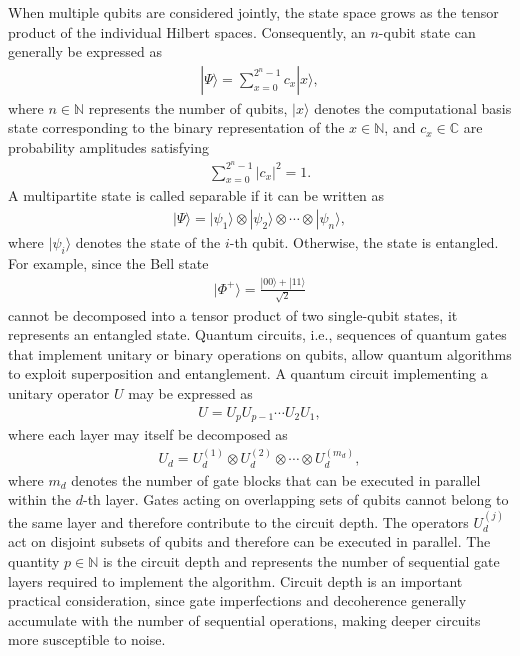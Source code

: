 When multiple qubits are considered jointly, the state space grows as the tensor product of the individual Hilbert spaces. Consequently, an $n$-qubit state can generally be expressed as \begin{align} 
|\Psi\rangle = \sum_{x=0}^{2^n-1} c_x |x\rangle,
\end{align} 
where $n \in \mathbb{N}$ represents the number of qubits, $|x\rangle$ denotes the computational basis state corresponding to
the binary representation of the $x \in \mathbb{N}$, and
$c_x\in\mathbb{C}$ are probability amplitudes satisfying
\begin{align}
\sum_{x=0}^{2^n-1}|c_x|^2=1.
\end{align}
A multipartite state is called separable if it can be written as
\begin{align} 
|\Psi\rangle = |\psi_1\rangle\otimes|\psi_2\rangle\otimes\cdots\otimes|\psi_n\rangle, 
\end{align} 
where $|\psi_i\rangle$ denotes the state of the $i$-th qubit. Otherwise, the state is entangled. For example, since the Bell state
\begin{align} 
|\Phi^+\rangle = \frac{|00\rangle+|11\rangle}{\sqrt{2}} \end{align} 
cannot be decomposed into a tensor product of two single-qubit states, it represents an entangled state.
Quantum circuits, i.e., sequences of quantum gates that implement unitary or binary operations on qubits, allow quantum algorithms to exploit superposition and entanglement. A quantum circuit implementing a unitary operator $U$ may be expressed as 
\begin{align} 
U = U_pU_{p-1}\cdots U_2U_1, \label{eq:depth}
\end{align} 
where each layer may itself be decomposed as
\begin{align}
\label{eq:layer}
U_d
=
U_d^{(1)}
\otimes
U_d^{(2)}
\otimes
\cdots
\otimes
U_d^{(m_d)},
\end{align}
where $m_d$ denotes the number of gate blocks that can be executed in
parallel within the $d$-th layer. Gates acting on overlapping sets of qubits cannot belong to the same layer and therefore contribute to the circuit depth. The operators $U_d^{(j)}$ act on disjoint subsets of qubits and therefore can be executed in parallel. The quantity $p \in \mathbb{N}$ is the circuit depth and represents the number of sequential gate layers required to implement the algorithm. Circuit depth is an important practical consideration, since gate imperfections and decoherence generally accumulate with the number of sequential operations, making deeper circuits more susceptible to noise.

